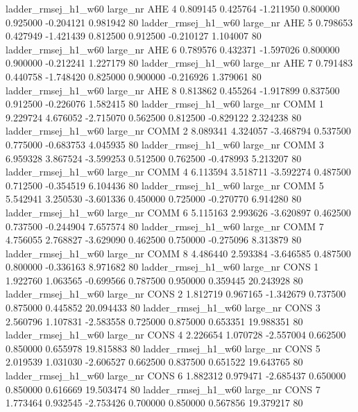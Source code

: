 ladder_rmsej_h1_w60   large_nr      AHE                 4  0.809145  0.425764  -1.211950 0.800000 0.925000 -0.204121    0.981942 80
ladder_rmsej_h1_w60   large_nr      AHE                 5  0.798653  0.427949  -1.421439 0.812500 0.912500 -0.210127    1.104007 80
ladder_rmsej_h1_w60   large_nr      AHE                 6  0.789576  0.432371  -1.597026 0.800000 0.900000 -0.212241    1.227179 80
ladder_rmsej_h1_w60   large_nr      AHE                 7  0.791483  0.440758  -1.748420 0.825000 0.900000 -0.216926    1.379061 80
ladder_rmsej_h1_w60   large_nr      AHE                 8  0.813862  0.455264  -1.917899 0.837500 0.912500 -0.226076    1.582415 80
ladder_rmsej_h1_w60   large_nr     COMM                 1  9.229724  4.676052  -2.715070 0.562500 0.812500 -0.829122    2.324238 80
ladder_rmsej_h1_w60   large_nr     COMM                 2  8.089341  4.324057  -3.468794 0.537500 0.775000 -0.683753    4.045935 80
ladder_rmsej_h1_w60   large_nr     COMM                 3  6.959328  3.867524  -3.599253 0.512500 0.762500 -0.478993    5.213207 80
ladder_rmsej_h1_w60   large_nr     COMM                 4  6.113594  3.518711  -3.592274 0.487500 0.712500 -0.354519    6.104436 80
ladder_rmsej_h1_w60   large_nr     COMM                 5  5.542941  3.250530  -3.601336 0.450000 0.725000 -0.270770    6.914280 80
ladder_rmsej_h1_w60   large_nr     COMM                 6  5.115163  2.993626  -3.620897 0.462500 0.737500 -0.244904    7.657574 80
ladder_rmsej_h1_w60   large_nr     COMM                 7  4.756055  2.768827  -3.629090 0.462500 0.750000 -0.275096    8.313879 80
ladder_rmsej_h1_w60   large_nr     COMM                 8  4.486440  2.593384  -3.646585 0.487500 0.800000 -0.336163    8.971682 80
ladder_rmsej_h1_w60   large_nr     CONS                 1  1.922760  1.063565  -0.699566 0.787500 0.950000  0.359445   20.243928 80
ladder_rmsej_h1_w60   large_nr     CONS                 2  1.812719  0.967165  -1.342679 0.737500 0.875000  0.445852   20.094433 80
ladder_rmsej_h1_w60   large_nr     CONS                 3  2.560796  1.107831  -2.583558 0.725000 0.875000  0.653351   19.988351 80
ladder_rmsej_h1_w60   large_nr     CONS                 4  2.226654  1.070728  -2.557004 0.662500 0.850000  0.655978   19.815883 80
ladder_rmsej_h1_w60   large_nr     CONS                 5  2.019539  1.031030  -2.606527 0.662500 0.837500  0.651522   19.643765 80
ladder_rmsej_h1_w60   large_nr     CONS                 6  1.882312  0.979471  -2.685437 0.650000 0.850000  0.616669   19.503474 80
ladder_rmsej_h1_w60   large_nr     CONS                 7  1.773464  0.932545  -2.753426 0.700000 0.850000  0.567856   19.379217 80
